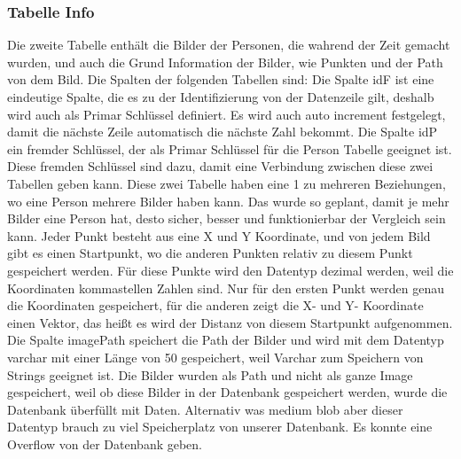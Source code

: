 \subsubsection{Tabelle Info}
Die zweite Tabelle enthält die Bilder der Personen, die wahrend der Zeit gemacht wurden, und auch die Grund Information der Bilder, wie Punkten und der Path von dem Bild. Die Spalten der folgenden Tabellen sind:
\bigbreak
Die Spalte idF ist eine eindeutige Spalte, die es zu der Identifizierung von der Datenzeile gilt, deshalb wird auch als Primar Schlüssel definiert. Es wird auch auto increment festgelegt, damit die nächste Zeile automatisch die nächste Zahl bekommt.
\bigbreak
Die Spalte idP ein fremder Schlüssel, der als Primar Schlüssel für die Person Tabelle geeignet ist. Diese fremden Schlüssel sind dazu, damit eine Verbindung zwischen diese zwei Tabellen geben kann. Diese zwei Tabelle haben eine 1 zu mehreren Beziehungen, wo eine Person mehrere Bilder haben kann. Das wurde so geplant, damit je mehr Bilder eine Person hat, desto sicher, besser und funktionierbar der Vergleich sein kann.
\bigbreak
Jeder Punkt besteht aus eine X und Y Koordinate, und von jedem Bild gibt es einen Startpunkt, wo die anderen Punkten relativ zu diesem Punkt gespeichert werden. Für diese Punkte wird den Datentyp dezimal werden, weil die Koordinaten kommastellen Zahlen sind. Nur für den ersten Punkt werden genau die Koordinaten gespeichert, für die anderen zeigt die X- und Y- Koordinate einen Vektor, das heißt es wird der Distanz von diesem Startpunkt aufgenommen.
\bigbreak
Die Spalte imagePath speichert die Path der Bilder und wird mit dem Datentyp varchar mit einer Länge von 50 gespeichert, weil Varchar zum Speichern von Strings geeignet ist. Die Bilder wurden als Path und nicht als ganze Image gespeichert, weil ob diese Bilder in der Datenbank gespeichert werden, wurde die Datenbank überfüllt mit Daten. Alternativ was medium blob aber dieser Datentyp brauch zu viel Speicherplatz von unserer Datenbank. Es konnte eine Overflow von der Datenbank geben.

